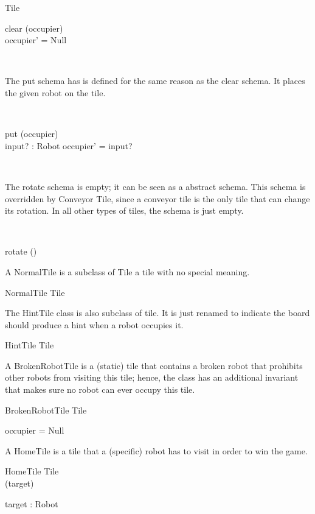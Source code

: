 \documentclass[12pt]{article}
\begin{document}
\begin{class}{Tile}
\begin{schema}{clear}
\Delta (occupier) \\
\where
occupier' = Null
\end{schema} \\
\begin{zpar}
The put schema has is defined for the same reason as the clear schema. It places the given robot on the tile.
\end{zpar}\\
\begin{schema}{put}
\Delta (occupier) \\
input? : Robot
\where
occupier' = input?
\end{schema} \\
\begin{zpar}
The rotate schema is empty; it can be seen as a abstract schema. This schema is overridden by Conveyor Tile, since a conveyor tile is the only tile that can change its rotation. In all other types of tiles, the schema is just empty.
\end{zpar} \\
\begin{schema}{rotate}
\Delta()
\end{schema}
\end{class}

A NormalTile is a subclass of Tile  a tile with no special meaning.
\begin{class}{NormalTile}
Tile
\end{class}

The HintTile class is also subclass of tile. It is just renamed to indicate the board should produce a hint when a robot occupies it.
\begin{class}{HintTile}
Tile
\end{class}

A BrokenRobotTile is a (static) tile that contains a broken robot that prohibits other robots from visiting this tile; hence, the class has an additional invariant that makes sure no robot can ever occupy this tile.
\begin{class}{BrokenRobotTile}
Tile \\
\begin{state}
occupier = Null
\end{state}
\end{class}

A HomeTile is a tile that a (specific) robot has to visit in order to win the game.
\begin{class}{HomeTile}
Tile \\
\upharpoonright (target) \\
\begin{state}
target : Robot
\end{state}
\end{class}
\end{document}
